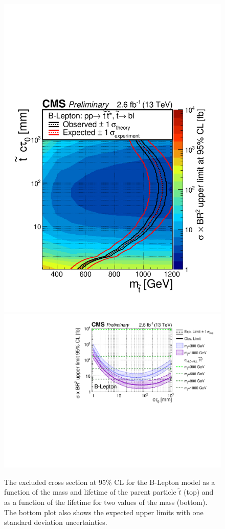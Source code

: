 \begin{figure}[tb]
\begin{center}
\includegraphics[width=.75\textwidth]{figures/pas//RESULT/UNBLINDED_LIMITS/B-Lepton2D.pdf}
\includegraphics[width=.85\textwidth]{figures/pas//RESULT/UNBLINDED_LIMITS/B-Lepton.pdf}
\caption{The excluded cross section at 95\% CL for the B-Lepton model
  as a function of the mass and lifetime of the parent particle
  $\tilde{t}$ (top) and as a function of the lifetime for two values
  of the mass (bottom).  The bottom plot also shows the expected upper
  limits with one standard deviation
  uncertainties.\label{fig:dsusy_limit_lepton}}
\end{center}
\end{figure}

